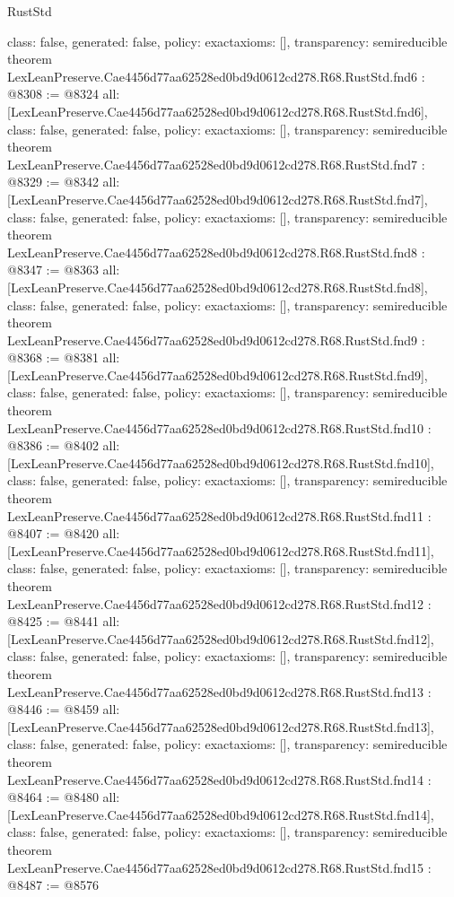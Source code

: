 \begin{lexlean}{RustStd}
\begin{coremodule}
{  class: false,
  generated: false,
  policy: exact{axioms: []},
  transparency: semireducible
}
theorem LexLeanPreserve.Cae4456d77aa62528ed0bd9d0612cd278.R68.RustStd.fnd6 : @8308 := @8324 {
  all: [LexLeanPreserve.Cae4456d77aa62528ed0bd9d0612cd278.R68.RustStd.fnd6],
  class: false,
  generated: false,
  policy: exact{axioms: []},
  transparency: semireducible
}
theorem LexLeanPreserve.Cae4456d77aa62528ed0bd9d0612cd278.R68.RustStd.fnd7 : @8329 := @8342 {
  all: [LexLeanPreserve.Cae4456d77aa62528ed0bd9d0612cd278.R68.RustStd.fnd7],
  class: false,
  generated: false,
  policy: exact{axioms: []},
  transparency: semireducible
}
theorem LexLeanPreserve.Cae4456d77aa62528ed0bd9d0612cd278.R68.RustStd.fnd8 : @8347 := @8363 {
  all: [LexLeanPreserve.Cae4456d77aa62528ed0bd9d0612cd278.R68.RustStd.fnd8],
  class: false,
  generated: false,
  policy: exact{axioms: []},
  transparency: semireducible
}
theorem LexLeanPreserve.Cae4456d77aa62528ed0bd9d0612cd278.R68.RustStd.fnd9 : @8368 := @8381 {
  all: [LexLeanPreserve.Cae4456d77aa62528ed0bd9d0612cd278.R68.RustStd.fnd9],
  class: false,
  generated: false,
  policy: exact{axioms: []},
  transparency: semireducible
}
theorem LexLeanPreserve.Cae4456d77aa62528ed0bd9d0612cd278.R68.RustStd.fnd10 : @8386 := @8402 {
  all: [LexLeanPreserve.Cae4456d77aa62528ed0bd9d0612cd278.R68.RustStd.fnd10],
  class: false,
  generated: false,
  policy: exact{axioms: []},
  transparency: semireducible
}
theorem LexLeanPreserve.Cae4456d77aa62528ed0bd9d0612cd278.R68.RustStd.fnd11 : @8407 := @8420 {
  all: [LexLeanPreserve.Cae4456d77aa62528ed0bd9d0612cd278.R68.RustStd.fnd11],
  class: false,
  generated: false,
  policy: exact{axioms: []},
  transparency: semireducible
}
theorem LexLeanPreserve.Cae4456d77aa62528ed0bd9d0612cd278.R68.RustStd.fnd12 : @8425 := @8441 {
  all: [LexLeanPreserve.Cae4456d77aa62528ed0bd9d0612cd278.R68.RustStd.fnd12],
  class: false,
  generated: false,
  policy: exact{axioms: []},
  transparency: semireducible
}
theorem LexLeanPreserve.Cae4456d77aa62528ed0bd9d0612cd278.R68.RustStd.fnd13 : @8446 := @8459 {
  all: [LexLeanPreserve.Cae4456d77aa62528ed0bd9d0612cd278.R68.RustStd.fnd13],
  class: false,
  generated: false,
  policy: exact{axioms: []},
  transparency: semireducible
}
theorem LexLeanPreserve.Cae4456d77aa62528ed0bd9d0612cd278.R68.RustStd.fnd14 : @8464 := @8480 {
  all: [LexLeanPreserve.Cae4456d77aa62528ed0bd9d0612cd278.R68.RustStd.fnd14],
  class: false,
  generated: false,
  policy: exact{axioms: []},
  transparency: semireducible
}
theorem LexLeanPreserve.Cae4456d77aa62528ed0bd9d0612cd278.R68.RustStd.fnd15 : @8487 := @8576 {
}
\end{coremodule}
\end{lexlean}
